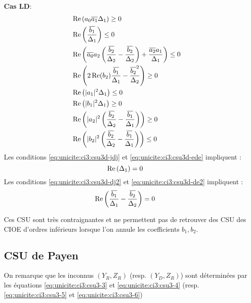   \begin{minipage}{0.49\textwidth}
    \textbf{Cas LD}:
    \begin{align}
      \label{eq:unicite:ci3:csu3d-j2}&\Re\left(a_0\conj{a_1}\Delta_1\right) \ge 0 \\
      \label{eq:unicite:ci3:csu3d-e2}&\Re\left(\frac{\conj{b_1}}{\Delta_1}\right) \le 0 \\
      \label{eq:unicite:ci3:csu3d-jrj}&\Re\left(\conj{a_0}a_2\left(\frac{\conj{b_2}}{\Delta_2}-\frac{\conj{b_2}}{\Delta_2}\right) + \frac{\conj{a_2}a_1}{\Delta_1} \right)\le 0\\
      \label{eq:unicite:ci3:csu3d-ere}&\Re\left(2\Re(b_2)\frac{\conj{b_1}}{\Delta_1}-\frac{\conj{b_2}^2}{\Delta_2}\right) \ge 0\\
      \label{eq:unicite:ci3:csu3d-jdj}&\Re\left(|a_1|^2\Delta_1\right) \le 0 \\
      \label{eq:unicite:ci3:csu3d-ede}&\Re\left(|b_1|^2\Delta_1\right) \ge 0 \\
      \label{eq:unicite:ci3:csu3d-dj2}&\Re\left(|a_2|^2\left(\frac{\conj{b_2}}{\Delta_2}-\frac{\conj{b_1}}{\Delta_1}\right)\right)\ge 0\\
      \label{eq:unicite:ci3:csu3d-de2}&\Re\left(|b_2|^2\left(\frac{\conj{b_2}}{\Delta_2}-\frac{\conj{b_1}}{\Delta_1}\right)\right)\le 0
    \end{align}
    Les conditions \eqref{eq:unicite:ci3:csu3d-jdj} et \eqref{eq:unicite:ci3:csu3d-ede} impliquent :
    \begin{equation}
      \Re\left(\Delta_1\right) = 0\\\
    \end{equation}
    Les conditions \eqref{eq:unicite:ci3:csu3d-dj2} et \eqref{eq:unicite:ci3:csu3d-de2} impliquent :
    \begin{equation}
      \Re\left(\frac{\conj{b_1}}{\Delta_1}-\frac{\conj{b_2}}{\Delta_2}\right) = 0\\\
    \end{equation}
  \end{minipage}

  Ces CSU sont très contraignantes et ne permettent pas de retrouver des CSU des CIOE d'ordres inférieurs lorsque l'on annule les coefficients \(b_1, b_2\).


\subsection{CSU de Payen}
  On remarque que les inconnus \((Y_R,Z_R)\) (resp. \((Y_D,Z_R)\)) sont déterminées par les équations \eqref{eq:unicite:ci3:csu3-3} et \eqref{eq:unicite:ci3:csu3-4} (resp. \eqref{eq:unicite:ci3:csu3-5} et \eqref{eq:unicite:ci3:csu3-6})

